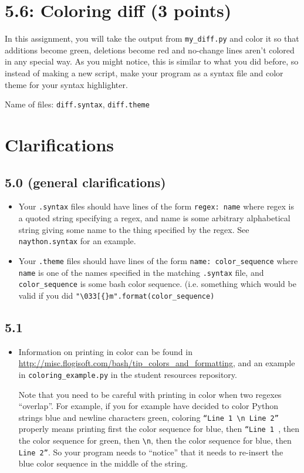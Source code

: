 \documentclass[english]{article}
\begin{document}
\section{5.6: Coloring diff (3 points)}
In this assignment, you will take the output from \texttt{my\_diff.py} and color it so that additions become green, deletions become red and no-change lines aren't colored in any special way. As you might notice, this is similar to what you did before, so instead of making a new script, make your program as a syntax file and color theme for your syntax highlighter.

Name of files: \texttt{diff.syntax}, \texttt{diff.theme}



\newpage

\section{Clarifications}

\subsection{5.0 (general clarifications)}
\begin{itemize}
\item Your \texttt{.syntax} files should have lines of the form \texttt{regex: name} where regex is a quoted string specifying a regex, and name is some arbitrary alphabetical string giving some name to the thing specified by the regex. See \texttt{naython.syntax} for an example.
\item Your \texttt{.theme} files should have lines of the form \texttt{name: color\_sequence} where \texttt{name} is one of the names specified in the matching \texttt{.syntax} file, and \texttt{color\_sequence} is some bash color sequence. (i.e. something which would be valid if you did \texttt{"\textbackslash033[\{\}m".format(color\_sequence)}
\end{itemize}


\subsection{5.1}
\begin{itemize}
\item Information on printing in color can be found in \url{http://misc.flogisoft.com/bash/tip_colors_and_formatting}, and an example in \texttt{coloring\_example.py} in the student resources repository.

Note that you need to be careful with printing in color when two regexes ``overlap''. For example, if you for example have decided to color Python strings blue and newline characters green, coloring \texttt{``Line 1 \textbackslash n Line 2''} properly means printing first the color sequence for blue, then \texttt{``Line 1 }, then the color sequence for green, then \texttt{\textbackslash n}, then the color sequence for blue, then \texttt{ Line 2''}. So your program needs to ``notice'' that it needs to re-insert the blue color sequence in the middle of the string.
\end{itemize}
\end{document}
